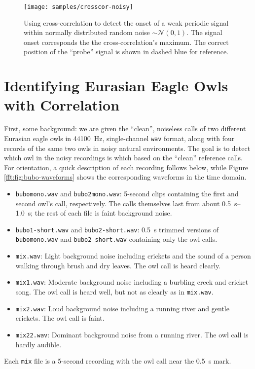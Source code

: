 \documentclass[11pt, a4paper]{article}
\begin{document}
\begin{figure}
\centering
\texttt{[image: samples/crosscor-noisy]}
\vspace{-7mm}
\caption{Using cross-correlation to detect the onset of a weak periodic signal within normally distributed random noise $ \sim \mathcal{N}(0, 1) $. The signal onset corresponds the the cross-correlation's maximum. The correct position of the ``probe'' signal is shown in dashed blue for reference. }
\label{fft:fig:crosscor-noisy}
\end{figure}


\section{Identifying Eurasian Eagle Owls with Correlation} \label{fft:s:owls}
First, some background: we are given the ``clean'', noiseless calls of two different Eurasian eagle owls in \SI{44100}{\hertz}, single-channel \texttt{wav} format, along with four records of the same two owls in noisy natural environments. The goal is to detect which owl in the noisy recordings is which based on the ``clean'' reference calls. For orientation, a quick description of each recording follows below, while Figure \ref{fft:fig:bubo-waveforms} shows the corresponding waveforms in the time domain. 
\begin{itemize}
	\item \texttt{bubomono.wav} and \texttt{bubo2mono.wav}: 5-second clips containing the first and second owl's call, respectively. The calls themselves last from about \SIrange{0.5}{1.0}{\second}; the rest of each file is faint background noise. 
	
	\item \texttt{bubo1-short.wav} and \texttt{bubo2-short.wav}: \SI{0.5}{\second} trimmed versions of \texttt{bubomono.wav} and \texttt{bubo2-short.wav} containing only the owl calls.
	
	\item \texttt{mix.wav}: Light background noise including crickets and the sound of a person walking through brush and dry leaves. The owl call is heard clearly.
	
	\item \texttt{mix1.wav}: Moderate background noise including a burbling creek and cricket song. The owl call is heard well, but not as clearly as in \texttt{mix.wav}.
	
	\item \texttt{mix2.wav}: Loud background noise including a running river and gentle crickets. The owl call is faint.
	
	\item \texttt{mix22.wav}: Dominant background noise from a running river. The owl call is hardly audible.
	
\end{itemize}
Each \texttt{mix} file is a 5-second recording with the owl call near the \SI{0.5}{\second} mark.
\end{document}
